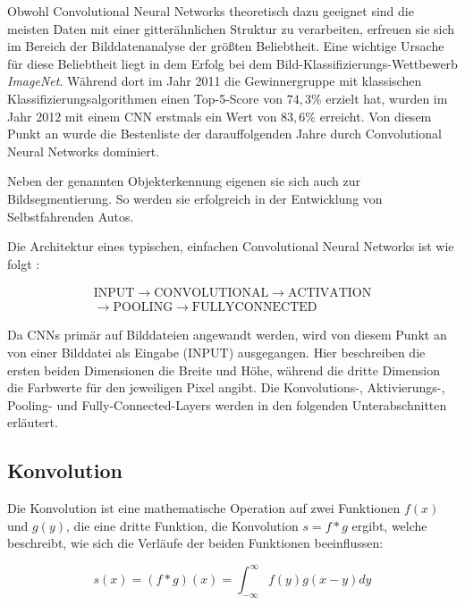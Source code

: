 Obwohl Convolutional Neural Networks theoretisch dazu geeignet sind die meisten Daten mit einer gitterähnlichen Struktur zu verarbeiten, erfreuen sie sich im Bereich der Bilddatenanalyse der größten Beliebtheit. \cite[Kap.~9]{deeplearning_16} Eine wichtige Ursache für diese Beliebtheit liegt \bspw in dem Erfolg bei dem Bild-Klassifizierungs-Wettbewerb \textit{ImageNet}. Während dort im Jahr 2011 die Gewinnergruppe mit klassischen Klassifizierungsalgorithmen einen Top-5-Score von $74,3\%$ erzielt hat, wurden im Jahr 2012 mit einem CNN erstmals ein Wert von $83,6\%$ erreicht. Von diesem Punkt an wurde die Bestenliste der darauffolgenden Jahre durch Convolutional Neural Networks dominiert. \cite[Kap.~1]{deeplearning_18}

Neben der genannten Objekterkennung eigenen sie sich auch zur Bildsegmentierung. So werden sie \bspw erfolgreich in der Entwicklung von Selbstfahrenden Autos. \cite{kaymak_19}

Die Architektur eines typischen, einfachen Convolutional Neural Networks ist wie folgt \cite{cs231n}:

\begin{multline*}
\mathrm{INPUT}\rightarrow\mathrm{CONVOLUTIONAL}\rightarrow\mathrm{ACTIVATION}\\\rightarrow\mathrm{POOLING}\rightarrow\mathrm{FULLYCONNECTED}
\end{multline*}

Da CNNs primär auf Bilddateien angewandt werden, wird von diesem Punkt an von einer Bilddatei als Eingabe ($\mathrm{INPUT}$) ausgegangen. Hier beschreiben die ersten beiden Dimensionen die Breite und Höhe, während die dritte Dimension die Farbwerte für den jeweiligen Pixel angibt. Die Konvolutions-, Aktivierungs-, Pooling- und Fully-Connected-Layers werden in den folgenden Unterabschnitten erläutert.

\subsection{Konvolution}
\label{ssec:conv}

Die Konvolution ist eine mathematische Operation auf zwei Funktionen $f(x)$ und $g(y)$, die eine dritte Funktion, die Konvolution $s = f*g$ ergibt, welche beschreibt, wie sich die Verläufe der beiden Funktionen beeinflussen:

\begin{equation}
s(x) = (f*g)(x) = \int_{-\infty}^{\infty} f(y)g(x-y)dy
\end{equation}


